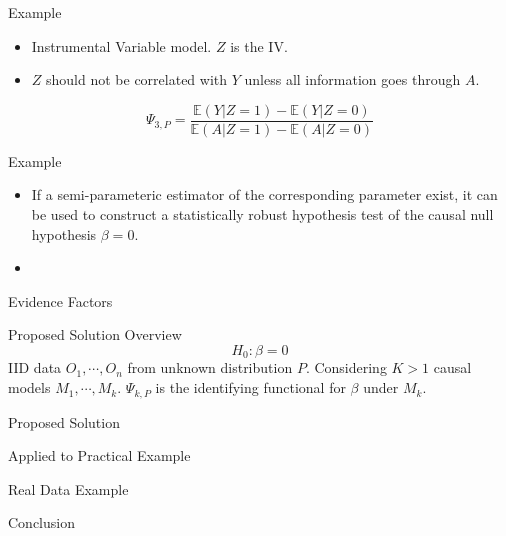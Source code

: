 \documentclass{beamer}
\begin{document}
\begin{frame}{Example}
	\begin{itemize}
		\item Instrumental Variable model. $ Z $ is the IV.
		\item $ Z $ should not be correlated with $ Y $ unless all information goes through $ A $.
	\end{itemize}
	$$ \Psi_{3, P} = \frac{\mathbb{E}(Y | Z = 1) - \mathbb{E}(Y | Z = 0)}{\mathbb{E}(A | Z = 1) - \mathbb{E}(A | Z=0)} $$
\end{frame}

\begin{frame}{Example}
	\begin{itemize}
		\item If a semi-parameteric estimator of the corresponding parameter exist, it can be used to construct a statistically robust hypothesis test of the causal null hypothesis $ \beta = 0 $.
		\item 
	\end{itemize}
\end{frame}

\begin{frame}{Evidence Factors}
\end{frame}

\begin{frame}{Proposed Solution Overview}
	$$ H_{0}: \beta = 0 $$
	IID data $ O_1, \cdots, O_n $ from unknown distribution $ P $.
	Considering $ K > 1 $ causal models $ M_1, \cdots, M_k $.
	$ \Psi_{k, P} $ is the identifying functional for $ \beta $ under $ M_k $.
\end{frame}

\begin{frame}{Proposed Solution}
\end{frame}

\begin{frame}{Applied to Practical Example}
\end{frame}

\begin{frame}{Real Data Example}
\end{frame}

\begin{frame}{Conclusion}
\end{frame}
\end{document}

